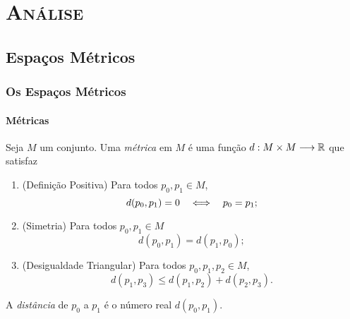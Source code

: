 \part{{\scshape Análise}}

\chapter{Espaços Métricos}

\section{Os Espaços Métricos}

\subsection{Métricas}

\begin{defi}
Seja $M$ um conjunto. Uma \emph{métrica} em $M$ é uma função $d: M \times M \longrightarrow \mathbb{R}$ que satisfaz
	\begin{enumerate}
	\item (Definição Positiva) Para todos $p_0,p_1 \in M$,
		\begin{equation*}
		d(p_0,p_1)=0 \quad \Longleftrightarrow \quad p_0=p_1;
		\end{equation*}
	\item (Simetria) Para todos $p_0,p_1 \in M$
		\begin{equation*}
		d(p_0,p_1)=d(p_1,p_0);
		\end{equation*}
	\item (Desigualdade Triangular) Para todos $p_0,p_1,p_2 \in M$,
		\begin{equation*}
		d(p_1,p_3) \leq d(p_1,p_2) + d(p_2,p_3).
		\end{equation*}
	\end{enumerate}
A \emph{distância} de $p_0$ a $p_1$ é o número real $d(p_0,p_1)$.
\end{defi}

